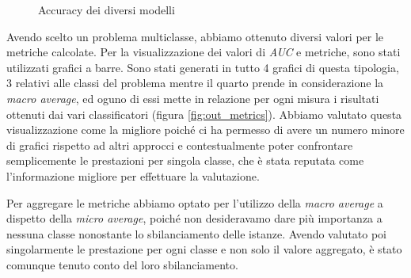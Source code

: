     \begin{figure}[h]
        \noindent{}
        \centering
        \caption{Accuracy dei diversi modelli}
        \label{fig:out_accuracyplot}
    \end{figure}
    
    Avendo scelto un problema multiclasse, abbiamo ottenuto diversi valori per le metriche calcolate. Per la visualizzazione dei valori di \textit{AUC} e metriche, sono stati utilizzati grafici a barre. Sono stati generati in tutto 4 grafici di questa tipologia, 3 relativi alle classi del problema mentre il quarto prende in considerazione la \textit{macro average}, ed oguno di essi mette in relazione per ogni misura i risultati ottenuti dai vari classificatori (figura \ref{fig:out_metrics}). 
    Abbiamo valutato questa visualizzazione come la migliore poiché ci ha permesso di avere un numero minore di grafici rispetto ad altri approcci e contestualmente poter confrontare semplicemente le prestazioni per singola classe, che è stata reputata come l'informazione migliore per effettuare la valutazione.
    
    Per aggregare le metriche abbiamo optato per l'utilizzo della \textit{macro average} a dispetto della \textit{micro average}, poiché non desideravamo dare più importanza a nessuna classe nonostante lo sbilanciamento delle istanze. Avendo valutato poi singolarmente le prestazione per ogni classe e non solo il valore aggregato, è stato comunque tenuto conto del loro sbilanciamento.
    
